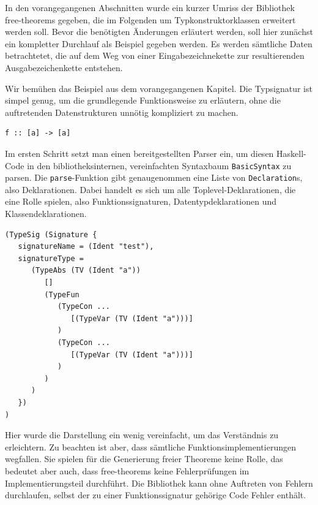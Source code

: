 \label{sec:free-theorems-beispiel}

In den vorangegangenen Abschnitten wurde ein kurzer Umriss der Bibliothek free-theorems gegeben, die im Folgenden um
Typkonstruktorklassen erweitert werden soll. Bevor die benötigten Änderungen erläutert werden, soll hier zunächst ein
kompletter Durchlauf als Beispiel gegeben werden. Es werden sämtliche Daten betrachtetet, die auf dem Weg von einer
Eingabezeichnekette zur resultierenden Ausgabezeichenkette entstehen.


Wir bemühen das Beispiel aus dem vorangegangenen Kapitel. Die Typsignatur ist simpel genug,
um die grundlegende Funktionsweise zu erläutern, ohne die auftretenden Datenstrukturen unnötig kompliziert zu machen.

\begin{verbatim}
f :: [a] -> [a]
\end{verbatim}

Im ersten Schritt setzt man einen bereitgestellten Parser ein, um diesen Haskell-Code in den bibliotheksinternen, vereinfachten
Syntaxbaum \texttt{BasicSyntax} zu parsen. Die \texttt{parse}-Funktion gibt genaugenommen eine Liste von \texttt{Declaration}s, also Deklarationen. Dabei handelt es sich um alle Toplevel-Deklarationen, die eine Rolle spielen, also Funktionssignaturen,
Datentypdeklarationen und Klassendeklarationen.


\begin{verbatim}
(TypeSig (Signature {
   signatureName = (Ident "test"),
   signatureType =
      (TypeAbs (TV (Ident "a"))
         []
         (TypeFun
            (TypeCon ...
               [(TypeVar (TV (Ident "a")))]
            )
            (TypeCon ...
               [(TypeVar (TV (Ident "a")))]
            )
         )
      )
   })
)
\end{verbatim}

Hier wurde die Darstellung ein wenig vereinfacht, um das Verständnis zu erleichtern. Zu beachten ist aber, dass sämtliche
Funktionsimplementierungen wegfallen. Sie spielen für die Generierung freier Theoreme keine Rolle, das bedeutet aber auch,
dass free-theorems keine Fehlerprüfungen im Implementierungsteil durchführt. Die Bibliothek kann ohne Auftreten von Fehlern
durchlaufen, selbst der zu einer Funktionssignatur gehörige Code Fehler enthält.

